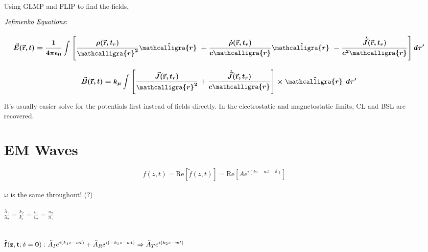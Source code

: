 \documentclass[12pt]{article}
\newcommand{\scripty}[1]{\ensuremath{\mathcalligra{#1}}}
\newcommand*{\cursr}{\scripty{r}}		%
\newcommand*{\cursrr}{\scripty{r}\ }
\newcommand{\hs}{\hspace{1pt}}
\begin{document}
\begin{minipage}[t]{0.49\textwidth}
	Using GLMP and FLIP to find the fields,

	\vspace{15pt}
	\(\boldsymbol{
		\begin{aligned}
			&\text{\emph{Jefimenko Equations}:}\\[10pt]
			&\ \ \ \ \begin{gathered}
				\vec{E}( \vec{ \mathbf{r} }, t) = \frac{1}{4 \pi \epsilon_0} 
					\int \left [ \frac{ \rho ( \vec{ \mathbf{r} }, t_r ) }{\cursr^2} \hat{\cursrr} 
					+ \frac{ \dot{\rho} ( \vec{ \mathbf{r} }, t_r ) }{c \cursr} \hat{\cursrr} 
					- \frac{ \dot{\vec{J}} ( \vec{ \mathbf{r} }, t_r ) }{c^2 \cursr} \right ] d\tau'
					\\[10pt]
				\vec{B}( \vec{ \mathbf{r} }, t) = k_\mu
					\int \left [ \frac{ \vec{J} ( \vec{ \mathbf{r} }, t_r ) }{\cursr^2} 
					+ \frac{ \dot{ \vec{J} } ( \vec{ \mathbf{r} }, t_r ) }{c \cursr} \right ] \times \hat{\cursrr} \hs d\tau'
			\end{gathered}
		\end{aligned}
	}\)

	\vspace{20pt}
	It's usually easier solve for the potentials first instead of fields directly. In 
	the electrostatic and magnetostatic limits, CL and BSL are recovered.
\end{minipage}


\newpage
\section{EM Waves}

\[ f(z,t) = \text{Re}[ \tilde f(z,t) ] = \text{Re}\left[ Ae^{i(kz-wt+\delta)} \right] \] \\
$\omega$ is the same throughout! (?) \\ \\
$\displaystyle \frac{\lambda_1}{\lambda_2} = \frac{k_2}{k_1} = \frac{v_1}{v_2} = \frac{n_2}{n_1}$ \\ \\ \\
${\bf \tilde f(z,t; \delta = 0): }\ \tilde A_I e^{ i(k_1z-wt) } + \tilde A_R e^{ i(-k_1z-wt) } \Rightarrow \tilde A_T e^{ i(k_2z-wt) }$ \\
\end{document}
